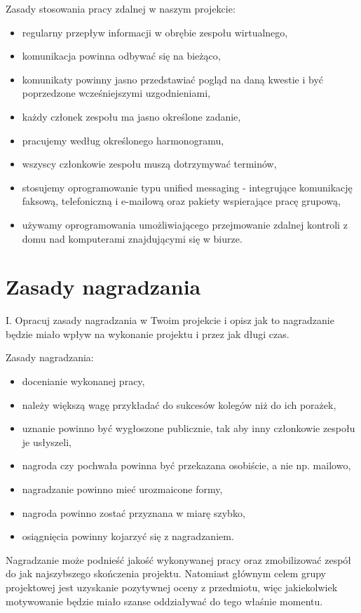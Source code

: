 Zasady stosowania pracy zdalnej w naszym projekcie:
\begin{itemize}
\item regularny przepływ informacji w obrębie zespołu wirtualnego,
\item komunikacja powinna odbywać się na bieżąco,
\item komunikaty powinny jasno przedstawiać pogląd na daną kwestie i  być poprzedzone wcześniejszymi uzgodnieniami,
\item każdy członek zespołu ma jasno określone zadanie,
\item pracujemy według określonego harmonogramu,
\item wszyscy członkowie zespołu muszą dotrzymywać terminów,
\item stosujemy oprogramowanie typu unified messaging - integrujące komunikację faksową, telefoniczną i e-mailową oraz pakiety wspierające pracę grupową,
\item używamy oprogramowania umożliwiającego przejmowanie zdalnej kontroli z domu nad komputerami znajdującymi się w biurze.

\end{itemize}



\section{Zasady nagradzania}

{I. Opracuj zasady nagradzania w Twoim projekcie i opisz jak to nagradzanie będzie miało wpływ na wykonanie projektu i przez jak długi czas.}

Zasady nagradzania:

\begin{itemize}
\item docenianie wykonanej pracy,
\item należy większą wagę przykładać do sukcesów kolegów niż do ich porażek,
\item uznanie powinno być wygłoszone publicznie, tak aby inny członkowie zespołu je usłyszeli,
\item nagroda czy pochwała powinna być przekazana osobiście, a nie np. mailowo,
\item nagradzanie powinno mieć urozmaicone formy,
\item nagroda powinno zostać przyznana w miarę szybko,
\item osiągnięcia powinny kojarzyć się z nagradzaniem.
\end{itemize}
Nagradzanie może podnieść jakość wykonywanej pracy oraz zmobilizować zespół do jak najszybszego skończenia projektu. Natomiast głównym celem grupy projektowej jest uzyskanie pozytywnej oceny 
z przedmiotu, więc jakiekolwiek motywowanie będzie miało szanse oddziaływać do tego właśnie momentu.


